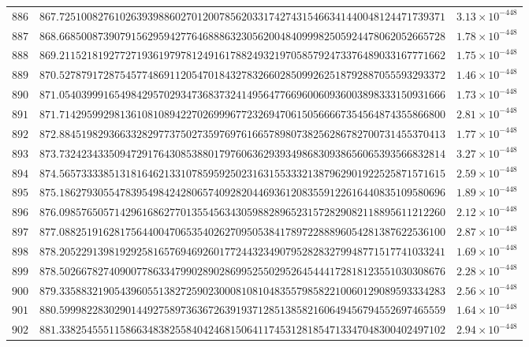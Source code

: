 \documentclass[12pt,reqno]{amsart}
\theoremstyle{remark}
\begin{document}
\begin{longtable}{clc}
$886$ & $867.7251008276102639398860270120078562033174274315466341440048124471739371$ & $3.13\times 10^{-448}$ \\
$887$ & $868.6685008739079156295942776468886323056200484099982505924478062052665728$ & $1.78\times 10^{-448}$ \\
$888$ & $869.2115218192772719361979781249161788249321970585792473376489033167771662$ & $1.75\times 10^{-448}$ \\
$889$ & $870.5278791728754577486911205470184327832660285099262518792887055593293372$ & $1.46\times 10^{-448}$ \\
$890$ & $871.0540399916549842957029347368373241495647766960060936003898333150931666$ & $1.73\times 10^{-448}$ \\
$891$ & $871.7142959929813610810894227026999677232694706150566667354564874355866800$ & $2.81\times 10^{-448}$ \\
$892$ & $872.8845198293663328297737502735976976166578980738256286782700731455370413$ & $1.77\times 10^{-448}$ \\
$893$ & $873.7324234335094729176430853880179760636293934986830938656065393566832814$ & $3.27\times 10^{-448}$ \\
$894$ & $874.5657333385131816462133107859592502316315533321387962901922525871571615$ & $2.59\times 10^{-448}$ \\
$895$ & $875.1862793055478395498424280657409282044693612083559122616440835109580696$ & $1.89\times 10^{-448}$ \\
$896$ & $876.0985765057142961686277013554563430598828965231572829082118895611212260$ & $2.12\times 10^{-448}$ \\
$897$ & $877.0882519162817564400470653540262709505384178972288896054281387622536100$ & $2.87\times 10^{-448}$ \\
$898$ & $878.2052291398192925816576946926017724432349079528283279948771517741033241$ & $1.69\times 10^{-448}$ \\
$899$ & $878.5026678274090077863347990289028699525502952645444172818123551030308676$ & $2.28\times 10^{-448}$ \\
$900$ & $879.3358832190543960551382725902300081081048355798582210060129089593334283$ & $2.56\times 10^{-448}$ \\
$901$ & $880.5999822830290144927589736367263919371285138582160649456794552697465559$ & $1.64\times 10^{-448}$ \\
$902$ & $881.3382545551158663483825584042468150641174531281854713347048300402497102$ & $2.94\times 10^{-448}$ \\

\end{longtable}
\end{document}
